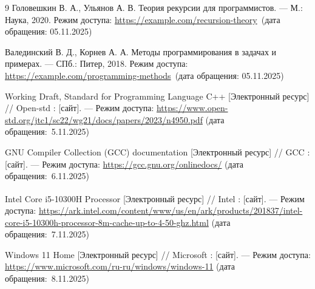 \begin{thebibliography}{9}
	Головешкин В. А., Ульянов А. В. 
	{Теория рекурсии для программистов}. --- М.: Наука, 2020.  
	Режим доступа: \url{https://example.com/recursion-theory}~(дата обращения: 05.11.2025)
	
	Валединский В. Д., Корнев А. А. 
	{Методы программирования в задачах и примерах}. --- СПб.: Питер, 2018.  
	Режим доступа: \url{https://example.com/programming-methods}~(дата обращения: 05.11.2025)
	
	Working Draft, Standard for Programming Language C++ [Электронный ресурс] // Open-std : [сайт]. --- Режим доступа: \url{https://www.open-std.org/jtc1/sc22/wg21/docs/papers/2023/n4950.pdf} (дата обращения:~5.11.2025)
	
	GNU Compiler Collection (GCC) documentation [Электронный ресурс] // GCC : [сайт]. --- Режим доступа: \url{https://gcc.gnu.org/onlinedocs/} (дата обращения:~6.11.2025)
	
	Intel\textsuperscript{\textregistered} Core\texttrademark{} i5-10300H Processor [Электронный ресурс] // Intel : [сайт]. --- Режим доступа: \url{https://ark.intel.com/content/www/us/en/ark/products/201837/intel-core-i5-10300h-processor-8m-cache-up-to-4-50-ghz.html} (дата обращения:~7.11.2025)
	
	Windows 11 Home [Электронный ресурс] // Microsoft : [сайт]. --- Режим доступа: \url{https://www.microsoft.com/ru-ru/windows/windows-11} (дата обращения:~8.11.2025)
\end{thebibliography}

